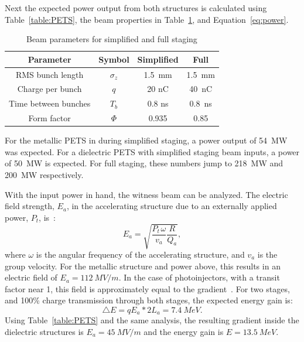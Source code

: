 Next the expected power output from both structures is calculated using Table~\ref{table:PETS}, 
the beam properties in Table~\ref{table:beam1}, and Equation~\ref{eq:power}. 
\begin{table}
	\begin{center}
		\caption{Beam parameters for simplified and full staging}
		\label{table:beam1}
		\begin{tabular}{cccc}  
			\toprule
			\toprule
			\textbf{Parameter} & \textbf{Symbol} & \textbf{Simplified} & \textbf{Full} \\
			\midrule
			RMS bunch length & $\sigma_{z}$ & \SI{1.5}{mm} & \SI{1.5}{mm}\\  
			Charge per bunch & $q$ & 20 nC & \SI{40}{nC}\\  
			Time between bunches & $T_{b}$ & 0.8 ns & \SI{0.8}{ns}\\  
			Form factor 		 & $\Phi$ & 0.935 & \SI{0.85}{}\\  
			\bottomrule
		\end{tabular}
	\end{center}
\end{table}
For the metallic PETS in during simplified staging, a power output of \SI{54}{MW} was expected.
For a dielectric PETS with simplified staging beam inputs, a power of \SI{50}{MW} is expected.
For full staging, these numbers jump to \SI{218}{MW} and \SI{200}{MW} respectively. 

With the input power in hand, the witness beam can be analyzed. 
The electric field strength, $E_{a}$, in 
the accelerating structure due to an externally applied power,
$P_{t}$, is~\cite{wangler}: 
\begin{equation}
	E_{a}=\sqrt{\frac{P_{t\,}\omega}{v_{a}}\frac{R}{Q_a}},
\label{eq:electricfield}
\end{equation}
where $\omega$ is the angular frequency of the accelerating structure,
and $v_{a}$ is the group velocity. 
For the metallic structure and power above, this results in an electric field of $E_a=\SI{112}{MV/m}$.
In the case of photoinjectors, with a transit factor near 1, this field is approximately equal to the gradient~\cite{wangler}. 
For two stages, and 100\% charge transmission through both stages,
the expected energy gain is: 
\begin{equation}
\triangle E=qE_a*2L_{a}=\SI{7.4}{MeV}.
\end{equation}
Using Table~\ref{table:PETS} and the same analysis, 
the resulting gradient inside the dielectric structures is
$E_a=\SI{45}{MV/m}$ and the energy gain is $E = \SI{13.5}{MeV}$.


